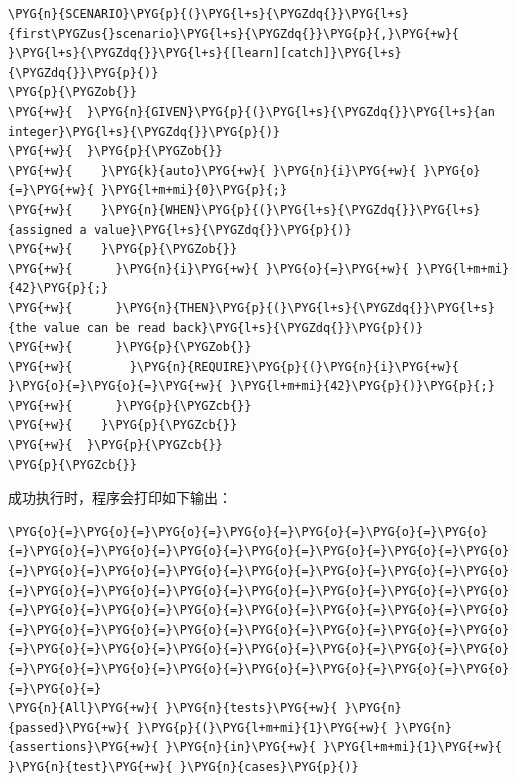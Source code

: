 \begin{codeblockbg}
\begin{Verbatim}[commandchars=\\\{\},breaklines=true,breakanywhere=true,fontsize=\codefont,xleftmargin=17bp]
\PYG{n}{SCENARIO}\PYG{p}{(}\PYG{l+s}{\PYGZdq{}}\PYG{l+s}{first\PYGZus{}scenario}\PYG{l+s}{\PYGZdq{}}\PYG{p}{,}\PYG{+w}{ }\PYG{l+s}{\PYGZdq{}}\PYG{l+s}{[learn][catch]}\PYG{l+s}{\PYGZdq{}}\PYG{p}{)}
\PYG{p}{\PYGZob{}}
\PYG{+w}{  }\PYG{n}{GIVEN}\PYG{p}{(}\PYG{l+s}{\PYGZdq{}}\PYG{l+s}{an integer}\PYG{l+s}{\PYGZdq{}}\PYG{p}{)}
\PYG{+w}{  }\PYG{p}{\PYGZob{}}
\PYG{+w}{    }\PYG{k}{auto}\PYG{+w}{ }\PYG{n}{i}\PYG{+w}{ }\PYG{o}{=}\PYG{+w}{ }\PYG{l+m+mi}{0}\PYG{p}{;}
\PYG{+w}{    }\PYG{n}{WHEN}\PYG{p}{(}\PYG{l+s}{\PYGZdq{}}\PYG{l+s}{assigned a value}\PYG{l+s}{\PYGZdq{}}\PYG{p}{)}
\PYG{+w}{    }\PYG{p}{\PYGZob{}}
\PYG{+w}{      }\PYG{n}{i}\PYG{+w}{ }\PYG{o}{=}\PYG{+w}{ }\PYG{l+m+mi}{42}\PYG{p}{;}
\PYG{+w}{      }\PYG{n}{THEN}\PYG{p}{(}\PYG{l+s}{\PYGZdq{}}\PYG{l+s}{the value can be read back}\PYG{l+s}{\PYGZdq{}}\PYG{p}{)}
\PYG{+w}{      }\PYG{p}{\PYGZob{}}
\PYG{+w}{        }\PYG{n}{REQUIRE}\PYG{p}{(}\PYG{n}{i}\PYG{+w}{ }\PYG{o}{=}\PYG{o}{=}\PYG{+w}{ }\PYG{l+m+mi}{42}\PYG{p}{)}\PYG{p}{;}
\PYG{+w}{      }\PYG{p}{\PYGZcb{}}
\PYG{+w}{    }\PYG{p}{\PYGZcb{}}
\PYG{+w}{  }\PYG{p}{\PYGZcb{}}
\PYG{p}{\PYGZcb{}}
\end{Verbatim}
\end{codeblockbg}



成功执行时，程序会打印如下输出：



\begin{codeblockbg}
\begin{Verbatim}[commandchars=\\\{\},breaklines=true,breakanywhere=true,fontsize=\codefont,xleftmargin=17bp]
\PYG{o}{=}\PYG{o}{=}\PYG{o}{=}\PYG{o}{=}\PYG{o}{=}\PYG{o}{=}\PYG{o}{=}\PYG{o}{=}\PYG{o}{=}\PYG{o}{=}\PYG{o}{=}\PYG{o}{=}\PYG{o}{=}\PYG{o}{=}\PYG{o}{=}\PYG{o}{=}\PYG{o}{=}\PYG{o}{=}\PYG{o}{=}\PYG{o}{=}\PYG{o}{=}\PYG{o}{=}\PYG{o}{=}\PYG{o}{=}\PYG{o}{=}\PYG{o}{=}\PYG{o}{=}\PYG{o}{=}\PYG{o}{=}\PYG{o}{=}\PYG{o}{=}\PYG{o}{=}\PYG{o}{=}\PYG{o}{=}\PYG{o}{=}\PYG{o}{=}\PYG{o}{=}\PYG{o}{=}\PYG{o}{=}\PYG{o}{=}\PYG{o}{=}\PYG{o}{=}\PYG{o}{=}\PYG{o}{=}\PYG{o}{=}\PYG{o}{=}\PYG{o}{=}\PYG{o}{=}\PYG{o}{=}\PYG{o}{=}\PYG{o}{=}\PYG{o}{=}\PYG{o}{=}\PYG{o}{=}\PYG{o}{=}\PYG{o}{=}\PYG{o}{=}
\PYG{n}{All}\PYG{+w}{ }\PYG{n}{tests}\PYG{+w}{ }\PYG{n}{passed}\PYG{+w}{ }\PYG{p}{(}\PYG{l+m+mi}{1}\PYG{+w}{ }\PYG{n}{assertions}\PYG{+w}{ }\PYG{n}{in}\PYG{+w}{ }\PYG{l+m+mi}{1}\PYG{+w}{ }\PYG{n}{test}\PYG{+w}{ }\PYG{n}{cases}\PYG{p}{)}
\end{Verbatim}
\end{codeblockbg}



